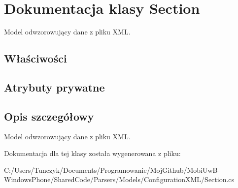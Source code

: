 \hypertarget{a00053}{}\section{Dokumentacja klasy Section}
\label{a00053}


Model odwzorowujący dane z pliku X\+M\+L.  


\subsection*{Właściwości}
\subsection*{Atrybuty prywatne}


\subsection{Opis szczegółowy}
Model odwzorowujący dane z pliku X\+M\+L. 



Dokumentacja dla tej klasy została wygenerowana z pliku\+:\begin{DoxyCompactItemize}
\item 
C\+:/\+Users/\+Tunczyk/\+Documents/\+Programowanie/\+Moj\+Github/\+Mobi\+Uw\+B-\/\+Windows\+Phone/\+Shared\+Code/\+Parsers/\+Models/\+Configuration\+X\+M\+L/Section.\+cs\end{DoxyCompactItemize}
